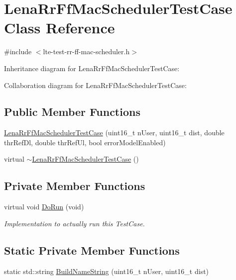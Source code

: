 \hypertarget{classLenaRrFfMacSchedulerTestCase}{}\section{Lena\+Rr\+Ff\+Mac\+Scheduler\+Test\+Case Class Reference}
\label{classLenaRrFfMacSchedulerTestCase}


{\ttfamily \#include $<$lte-\/test-\/rr-\/ff-\/mac-\/scheduler.\+h$>$}



Inheritance diagram for Lena\+Rr\+Ff\+Mac\+Scheduler\+Test\+Case\+:


Collaboration diagram for Lena\+Rr\+Ff\+Mac\+Scheduler\+Test\+Case\+:
\subsection*{Public Member Functions}
\begin{DoxyCompactItemize}
\item 
\hyperlink{classLenaRrFfMacSchedulerTestCase_aaa8d659da4a77c08b84352c217ca949d}{Lena\+Rr\+Ff\+Mac\+Scheduler\+Test\+Case} (uint16\+\_\+t n\+User, uint16\+\_\+t dist, double thr\+Ref\+Dl, double thr\+Ref\+Ul, bool error\+Model\+Enabled)
\item 
virtual \hyperlink{classLenaRrFfMacSchedulerTestCase_a8b07d4fdc9367766153b170c7dfc4ed4}{$\sim$\+Lena\+Rr\+Ff\+Mac\+Scheduler\+Test\+Case} ()
\end{DoxyCompactItemize}
\subsection*{Private Member Functions}
\begin{DoxyCompactItemize}
\item 
virtual void \hyperlink{classLenaRrFfMacSchedulerTestCase_a1e221eff047ec55f7f1d36daab1f1d91}{Do\+Run} (void)
\begin{DoxyCompactList}\small\item\em Implementation to actually run this Test\+Case. \end{DoxyCompactList}\end{DoxyCompactItemize}
\subsection*{Static Private Member Functions}
\begin{DoxyCompactItemize}
\item 
static std\+::string \hyperlink{classLenaRrFfMacSchedulerTestCase_a90ec076033e681b9953bfccd9fe9bf35}{Build\+Name\+String} (uint16\+\_\+t n\+User, uint16\+\_\+t dist)
\end{DoxyCompactItemize}
